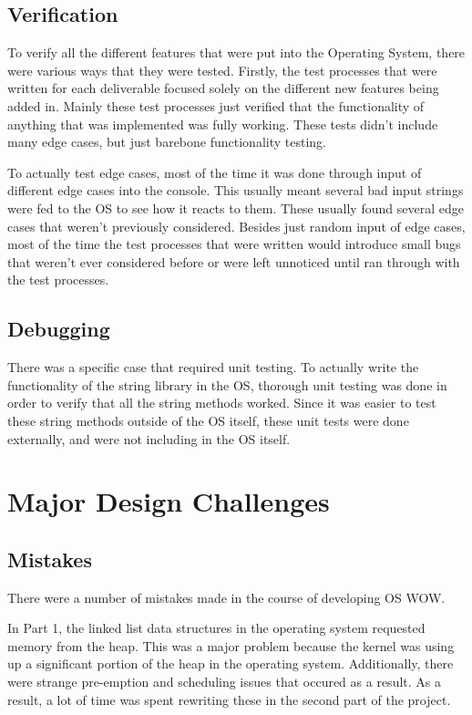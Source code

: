 \documentclass[se]{uw-wkrpt}
\begin{document}
\subsection{Verification}
To verify all the different features that were put into the Operating System, there were various ways that they were tested. Firstly, the test processes that were written for each deliverable focused solely on the different new features being added in. Mainly these test processes just verified that the functionality of anything that was implemented was fully working. These tests didn't include many edge cases, but just barebone functionality testing. 

To actually test edge cases, most of the time it was done through input of different edge cases into the console. This usually meant several bad input strings were fed to the OS to see how it reacts to them. These usually found several edge cases that weren't previously considered. Besides just random input of edge cases, most of the time the test processes that were written would introduce small bugs that weren't ever considered before or were left unnoticed until ran through with the test processes. 
\subsection{Debugging}
 
There was a specific case that required unit testing. To actually write the functionality of the string library in the OS, thorough unit testing was done in order to verify that all the string methods worked. Since it was easier to test these string methods outside of the OS itself, these unit tests were done externally, and were not including in the OS itself.

\section{Major Design Challenges}\label{sec:design}

\subsection{Mistakes}

There were a number of mistakes made in the course of developing OS WOW.

In Part 1, the linked list data structures in the operating system requested memory from the heap. This was a major problem because the kernel was using up a significant portion of the heap in the operating system. Additionally, there were strange pre-emption and scheduling issues that occured as a result. As a result, a lot of time was spent rewriting these in the second part of the project.
\end{document}
